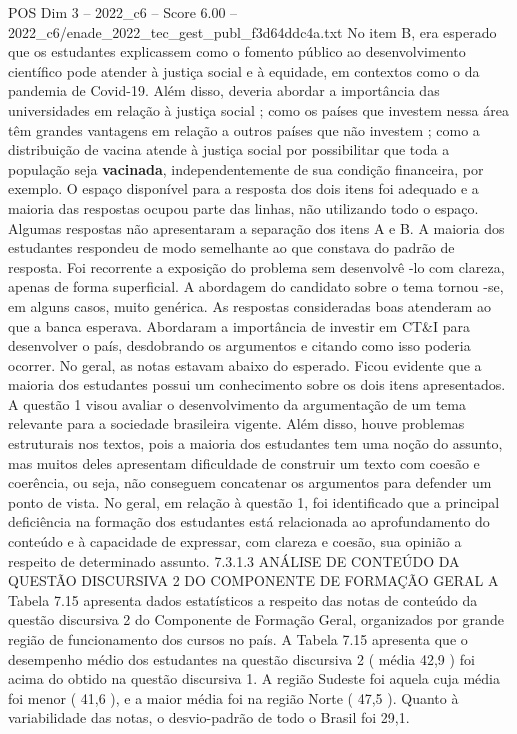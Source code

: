 \begin{textsample}{POS Dim 3 – 2022\_c6 – Score 6.00 – 2022\_c6/enade\_2022\_tec\_gest\_publ\_f3d64ddc4a.txt}
No item B, era esperado que os estudantes explicassem como o fomento público ao desenvolvimento científico pode atender à justiça social e à equidade, em contextos como o da pandemia de Covid-19.
Além disso, deveria abordar a importância das universidades em relação à justiça social ; como os países que investem nessa área têm grandes vantagens em relação a outros países que não investem ; como a distribuição de vacina atende à justiça social por possibilitar que toda a população seja \textbf{vacinada}, independentemente de sua condição financeira, por exemplo.
O espaço disponível para a resposta dos dois itens foi adequado e a maioria das respostas ocupou parte das linhas, não utilizando todo o espaço.
Algumas respostas não apresentaram a separação dos itens A e B.
A maioria dos estudantes respondeu de modo semelhante ao que constava do padrão de resposta.
Foi recorrente a exposição do problema sem desenvolvê -lo com clareza, apenas de forma superficial.
A abordagem do candidato sobre o tema tornou -se, em alguns casos, muito genérica.
As respostas consideradas boas atenderam ao que a banca esperava.
Abordaram a importância de investir em CT\&I para desenvolver o país, desdobrando os argumentos e citando como isso poderia ocorrer.
No geral, as notas estavam abaixo do esperado.
Ficou evidente que a maioria dos estudantes possui um conhecimento sobre os dois itens apresentados.
A questão 1 visou avaliar o desenvolvimento da argumentação de um tema relevante para a sociedade brasileira vigente.
Além disso, houve problemas estruturais nos textos, pois a maioria dos estudantes tem uma noção do assunto, mas muitos deles apresentam dificuldade de construir um texto com coesão e coerência, ou seja, não conseguem concatenar os argumentos para defender um ponto de vista.
No geral, em relação à questão 1, foi identificado que a principal deficiência na formação dos estudantes está relacionada ao aprofundamento do conteúdo e à capacidade de expressar, com clareza e coesão, sua opinião a respeito de determinado assunto. 7.3.1.3 ANÁLISE DE CONTEÚDO DA QUESTÃO DISCURSIVA 2 DO COMPONENTE DE FORMAÇÃO GERAL A Tabela 7.15 apresenta dados estatísticos a respeito das notas de conteúdo da questão discursiva 2 do Componente de Formação Geral, organizados por grande região de funcionamento dos cursos no país.
A Tabela 7.15 apresenta que o desempenho médio dos estudantes na questão discursiva 2 ( média 42,9 ) foi acima do obtido na questão discursiva 1.
A região Sudeste foi aquela cuja média foi menor ( 41,6 ), e a maior média foi na região Norte ( 47,5 ).
Quanto à variabilidade das notas, o desvio-padrão de todo o Brasil foi 29,1.

\end{textsample}
